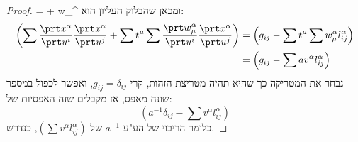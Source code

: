 \documentclass{article}
\theoremstyle{definition}
\begin{document}
\begin{proof}
			=\sum {}  + \sum w_\mu^\alpha {}
		\)
		ומכאן שהבלוק העליון הוא:
		\begin{equation*}\begin{split}
			\left(\sum \frac{\prt x^\alpha}{\prt u^i} \frac{\prt x^\alpha}{\prt u^j} + \sum t^\mu \sum \frac{\prt w_\mu^\alpha}{\prt u^i} \frac{\prt x^\alpha}{\prt u^j}\right)
			&= \left(g_{ij} - \sum t^\mu \sum w_\mu^\alpha l^\alpha_{ij}\right)
			\\&= \left(g_{ij} - \sum a v^\alpha l^\alpha_{ij}\right)
		\end{split}\end{equation*}
		נבחר את המטריקה כך שהיא תהיה מטריצת הזהות, קרי
		\(g_{ij}=\delta_{ij}\),
		ואפשר לכפול במספר שונה מאפס, אז מקבלים שזה האפסיות של:
		\[
			\left(a^{-1} \delta_{ij} - \sum v^\alpha l^\alpha_{ij}\right)
		\]
		כלומר הריבוי של הע"ע
		\(a^{-1}\)
		של
		\(
			\left(\sum v^\alpha l^\alpha_{ij}\right)
		\),
		כנדרש.
	\end{proof}
	
\end{document}

